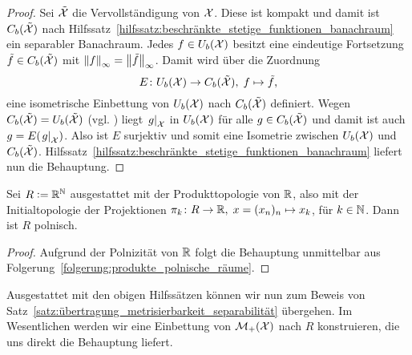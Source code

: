 \documentclass[../thesis/thesis.tex]{subfiles}
\begin{document}
	\begin{proof}
		Sei $\tilde{\mathcal{X}}$ die Vervollständigung von $\mathcal{X}$. Diese ist kompakt und damit ist $C_b(\tilde{\mathcal{X}})$ nach Hilfssatz~\ref{hilfssatz:beschränkte_stetige_funktionen_banachraum} ein separabler Banachraum.
		Jedes $f \in U_b(\mathcal{X})$ besitzt eine eindeutige Fortsetzung $\tilde{f} \in C_b(\tilde{\mathcal{X}})$ mit $\left\lVert f\right\rVert_\infty = \left\lVert\tilde{f}\right\rVert_\infty$. Damit wird über die Zuordnung
		\[ E \colon U_b(\mathcal{X}) \to C_b(\tilde{\mathcal{X}}), \; f \mapsto \tilde{f}  \text{,} \]
		eine isometrische Einbettung von $U_b(\mathcal{X})$ nach $C_b(\tilde{\mathcal{X}})$ definiert. 
		Wegen $C_b(\tilde{\mathcal{X}}) = U_b(\tilde{\mathcal{X}})$ (vgl. \cite[Theorem 2.4.1]{Simon.2015}) liegt $\left.g\right|_{\mathcal{X}}$ in $U_b(\mathcal{X})$ für alle $g \in C_b(\tilde{\mathcal{X}})$ und damit ist
		auch $g = E(\left.g\right|_{\mathcal{X}})$. Also ist $E$ surjektiv und somit eine Isometrie zwischen $U_b(\mathcal{X})$ und $C_b(\tilde{\mathcal{X}})$. Hilfssatz~\ref{hilfssatz:beschränkte_stetige_funktionen_banachraum} liefert nun die Behauptung.
	\end{proof}
	
	\begin{Hilfssatz}
		\label{hilfssatz:einbettungsraum_R}
		Sei $R \vcentcolon = \mathbb{R}^{\mathbb{N}}$ ausgestattet mit der Produkttopologie von $\mathbb{R}$, also mit der Initialtopologie der Projektionen $\pi_k \colon R \to \mathbb{R}, \; x = (x_n)_n \mapsto x_k $, für $k \in \mathbb{N}$. Dann ist $R$ 
		polnisch.
	\end{Hilfssatz}
	
	\begin{proof}
		Aufgrund der Polnizität von $\mathbb{R}$ folgt die Behauptung unmittelbar aus Folgerung~\ref{folgerung:produkte_polnische_räume}.
	\end{proof}

	Ausgestattet mit den obigen Hilfssätzen können wir nun zum Beweis von Satz~\ref{satz:übertragung_metrisierbarkeit_separabilität} übergehen. Im Wesentlichen werden wir eine Einbettung von $\mathcal{M}_{+}(\mathcal{X})$ nach $R$ konstruieren, die uns direkt die Behauptung liefert.
	
\end{document}
